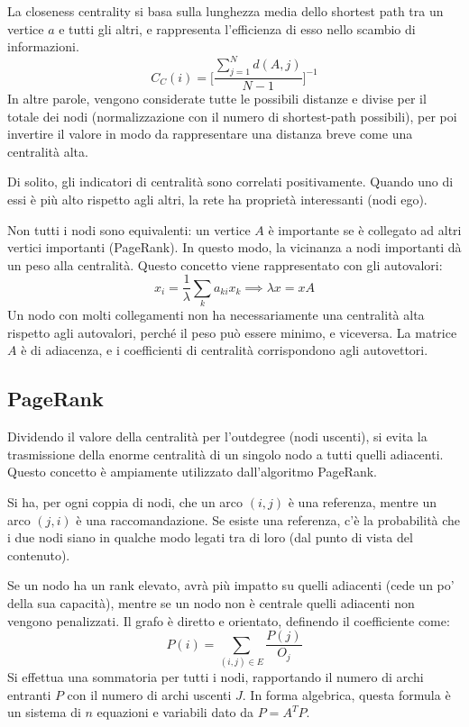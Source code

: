 La closeness centrality si basa sulla lunghezza media dello shortest path tra un vertice $a$ e tutti gli altri, e rappresenta l'efficienza di esso nello scambio di informazioni. 
$$C_C(i) = \Bigg[\frac{\sum_{j=1}^{N} d(A, j)}{N - 1}\Bigg]^{-1}$$
In altre parole, vengono considerate tutte le possibili distanze e divise per il totale dei nodi (normalizzazione con il numero di shortest-path possibili), per poi invertire il valore in modo da rappresentare una distanza breve come una centralità alta. 

Di solito, gli indicatori di centralità sono correlati positivamente. Quando uno di essi è più alto rispetto agli altri, la rete ha proprietà interessanti (nodi ego).

Non tutti i nodi sono equivalenti: un vertice $A$ è importante se è collegato ad altri vertici importanti (PageRank). In questo modo, la vicinanza a nodi importanti dà un peso alla centralità. Questo concetto viene rappresentato con gli autovalori:
$$x_i = \frac{1}{\lambda} \sum_{k} a_{ki} x_k \implies \lambda x = xA$$
Un nodo con molti collegamenti non ha necessariamente una centralità alta rispetto agli autovalori, perché il peso può essere minimo, e viceversa. La matrice $A$ è di adiacenza, e i coefficienti di centralità corrispondono agli autovettori.

\subsection{PageRank}
Dividendo il valore della centralità per l'outdegree (nodi uscenti), si evita la trasmissione della enorme centralità di un singolo nodo a tutti quelli adiacenti. Questo concetto è ampiamente utilizzato dall'algoritmo PageRank.

Si ha, per ogni coppia di nodi, che un arco $(i, j)$ è una referenza, mentre un arco $(j, i)$ è una raccomandazione. Se esiste una referenza, c'è la probabilità che i due nodi siano in qualche modo legati tra di loro (dal punto di vista del contenuto).

Se un nodo ha un rank elevato, avrà più impatto su quelli adiacenti (cede un po' della sua capacità), mentre se un nodo non è centrale quelli adiacenti non vengono penalizzati. Il grafo è diretto e orientato, definendo il coefficiente come:
$$P(i) = \sum_{(i, j) \in E} \frac{P(j)}{O_j}$$
Si effettua una sommatoria per tutti i nodi, rapportando il numero di archi entranti $P$ con il numero di archi uscenti $J$. In forma algebrica, questa formula è un sistema di $n$ equazioni e variabili dato da $P = A^TP$.

